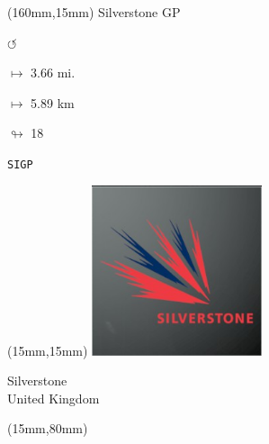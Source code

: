 \begin{textblock*}{40mm}(160mm,15mm)%
Silverstone GP
\par \Huge$\circlearrowleft$
\Large
\par$\mapsto$ 3.66 mi.
\par$\mapsto$ 5.89 km
\par$\looparrowright$ 18
\par\hfill\tiny\tt SIGP\\
\end{textblock*}
\null\newpage

\begin{textblock*}{50mm}(15mm,15mm)%
\includegraphics[width=50mm]{LG/2015-05-20_00094.png}
\par Silverstone\\ United Kingdom
\end{textblock*}
\begin{textblock*}{185mm}(15mm,80mm)%
\end{textblock*}
